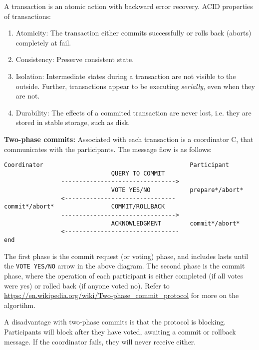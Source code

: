 A transaction is an atomic action with backward error recovery.
ACID properties of transactions:
\begin{enumerate}
    \item Atomicity: The transaction either commits successfully or rolls back (aborts) completely at fail.
    \item Consistency: Preserve consistent state.
    \item Isolation: Intermediate states during a transaction are not visible to the outside. Further, transactions appear to be executing \emph{serially}, even when they are not.
    \item Durability: The effects of a commited transaction are never lost, i.e. they are stored in stable storage, such as disk.
\end{enumerate}
\textbf{Two-phase commits:}
Associated with each transaction is a coordinator C, that communicates with the participants. The message flow is as follows:
\begin{verbatim}
Coordinator                                         Participant
                              QUERY TO COMMIT
                -------------------------------->
                              VOTE YES/NO           prepare*/abort*
                <-------------------------------
commit*/abort*                COMMIT/ROLLBACK
                -------------------------------->
                              ACKNOWLEDGMENT        commit*/abort*
                <--------------------------------  
end
\end{verbatim}
The first phase is the commit request (or voting) phase, and includes lasts until the \texttt{VOTE YES/NO} arrow in the above diagram. The second phase is the commit phase, where the operation of each participant is either completed (if all votes were yes) or rolled back (if anyone voted no). Refer to \url{https://en.wikipedia.org/wiki/Two-phase_commit_protocol} for more on the algortihm.

A disadvantage with two-phase commits is that the protocol is blocking. Participants will block after they have voted, awaiting a commit or rollback message. If the coordinator fails, they will never receive either.





